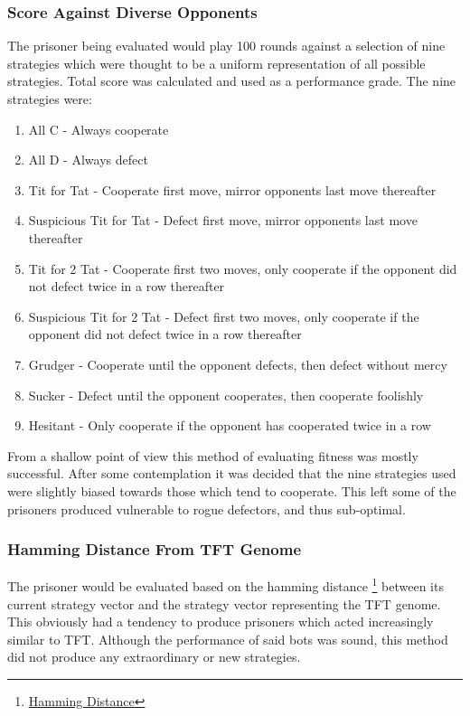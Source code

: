 \documentclass[12pt]{article}
\begin{document}
\subsubsection{Score Against Diverse Opponents}
The prisoner being evaluated would play 100 rounds against a selection of nine
strategies which were thought to be a uniform representation of all possible
strategies.  Total score was calculated and used as a performance grade.
The nine strategies were:
\begin{enumerate}
    \item All C - Always cooperate
    \item All D - Always defect
    \item Tit for Tat - Cooperate first move, mirror opponents last move thereafter
    \item Suspicious Tit for Tat - Defect first move, mirror opponents last move
        thereafter
    \item Tit for 2 Tat - Cooperate first two moves, only cooperate if the
        opponent did not defect twice in a row thereafter
    \item Suspicious Tit for 2 Tat - Defect first two moves, only cooperate if the
        opponent did not defect twice in a row thereafter
    \item Grudger - Cooperate until the opponent defects, then defect without mercy
    \item Sucker - Defect until the opponent cooperates, then cooperate foolishly
    \item Hesitant - Only cooperate if the opponent has cooperated twice in a row
\end{enumerate}

From a shallow point of view this method of evaluating fitness was mostly
successful.  After some contemplation it was decided that the
nine strategies used were slightly biased towards those which tend to cooperate.
This left some of the prisoners produced vulnerable to rogue defectors,
and thus sub-optimal.

\subsubsection{Hamming Distance From TFT Genome}
The prisoner would be evaluated based on the hamming distance
\footnote
{\href{https://en.wikipedia.org/wiki/Hamming distance}{Hamming Distance}}
between its current strategy vector and the strategy vector representing
the TFT genome.  This obviously had a tendency to produce prisoners which
acted increasingly similar to TFT.  Although the performance of said bots
was sound, this method did not produce any extraordinary or new strategies.
\end{document}
